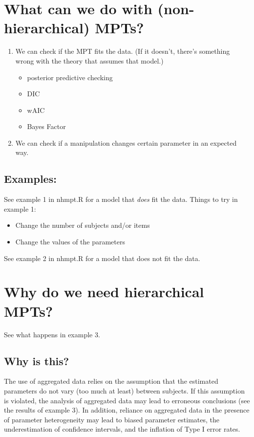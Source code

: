 \documentclass[10pt,a4paper]{article}
\begin{document}
\section{What can we do with (non-hierarchical) MPTs?}
\begin{enumerate}
\item We can check if the MPT fits the data. (If it doesn't, there's something wrong with the theory that assumes that model.)
\begin{itemize}
\item posterior predictive checking
\item DIC
\item wAIC
\item Bayes Factor
\end{itemize}
\item We can check if a manipulation changes certain parameter in an expected way.
\end{enumerate}

\subsection{Examples:}
See example 1 in nhmpt.R for  a model that \emph{does} fit the data.
Things to try in example 1:
\begin{itemize}
\item Change the number of subjects and/or items
\item Change the values of the parameters
\end{itemize}

See example 2 in nhmpt.R for  a model that does not fit the data.


\section{Why do we need hierarchical MPTs?}

See what happens in example 3.

\subsection{Why is this?}

The use of aggregated data relies on the assumption that the estimated parameters do not vary (too much at least) between subjects. If this assumption is violated, the analysis of
aggregated data may lead to erroneous conclusions (see the results of example 3). In addition, reliance on aggregated data in the presence of parameter heterogeneity may lead to biased parameter
estimates, the underestimation of confidence intervals, and the inflation of Type I error rates.
\end{document}
